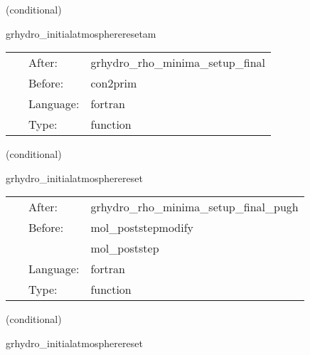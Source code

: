 \documentclass{article}
\begin{document}
\vspace{5mm}

   (conditional) 

\hspace{5mm} grhydro\_initialatmosphereresetam 

\hspace{5mm}{\it use mask to enforce atmosphere at initial time } 


\hspace{5mm}

 \begin{tabular*}{160mm}{cll} 
~ & After:  & grhydro\_rho\_minima\_setup\_final \\ 
~ & Before:  & con2prim \\ 
~ & Language:  & fortran \\ 
~ & Type:  & function \\ 
\end{tabular*} 


\vspace{5mm}

   (conditional) 

\hspace{5mm} grhydro\_initialatmospherereset 

\hspace{5mm}{\it use mask to enforce atmosphere at initial time } 


\hspace{5mm}

 \begin{tabular*}{160mm}{cll} 
~ & After:  & grhydro\_rho\_minima\_setup\_final\_pugh \\ 
~ & Before:  & mol\_poststepmodify \\ 
~& ~ &mol\_poststep\\ 
~ & Language:  & fortran \\ 
~ & Type:  & function \\ 
\end{tabular*} 


\vspace{5mm}

   (conditional) 

\hspace{5mm} grhydro\_initialatmospherereset 

\hspace{5mm}{\it use mask to enforce atmosphere at initial time } 


\hspace{5mm}
\end{document}
